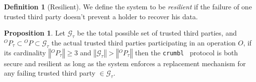 \documentclass[twoside,twocolumn]{article}
\newcommand{\norm}[1]{\left\Vert#1\right\Vert}
\theoremstyle{definition}
\newtheorem{definition}{Definition}
\newtheorem{proposition}{Proposition}
\theoremstyle{remark}
\begin{document}
\begin{definition}[Resilient]
    \label{resilient}
    We define the system to be \emph{resilient} if the failure of one trusted third party doesn't prevent a holder to recover his data.
\end{definition}

\begin{proposition}
    \label{prop:ttp3}
    Let $\mathcal{G}_\tau$ be the total possible set of trusted third parties, and ${}^OP_\tau \subset {}^OP \subset \mathcal{G}_\tau$ the actual 
    trusted third parties participating in an operation $O$, if its cardinality $\norm{{}^OP_\tau} \geq 3$ and $\norm{\mathcal{G}_\tau} > \norm{{}^OP_\tau}$ then the 
    \texttt{crumbl}\texttrademark~ protocol is both secure and resilient as long as the system enforces a replacement mechanism for any failing trusted 
    third party $\in \mathcal{G}_\tau$.
\end{proposition}
\end{document}
